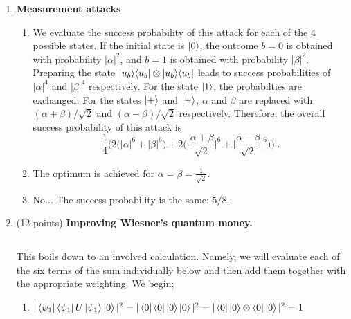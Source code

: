 \documentclass[12pt]{article}
\begin{document}
\begin{enumerate}
		


\item {\bf Measurement attacks}

\begin{enumerate}
\item We evaluate the success probability of this attack for each of the $4$ possible states. If the initial state is $\ket{0}$, the outcome $b=0$ is obtained with probability $|\alpha|^2$, and $b=1$ is obtained with probability $|\beta|^2$. Preparing the state $\ket{u_b}\!\bra{u_b} \otimes \ket{u_b}\!\bra{u_b}$ leads to success probabilities of $|\alpha|^4$ and $|\beta|^4$ respectively. For the state $\ket{1}$, the probabilties are exchanged. For the states $\ket{+}$ and $\ket{-}$, $\alpha$ and $\beta$ are replaced with $(\alpha + \beta)/\sqrt{2}$ and $(\alpha-\beta)/\sqrt{2}$ respectively. Therefore, the overall success probability of this attack is 
\[ \frac{1}{4}\Big( 2 \big( |\alpha|^6 + |\beta|^6\big) + 2\Big( \Big| \frac{\alpha + \beta}{\sqrt{2}}\Big|^6
+\Big| \frac{\alpha - \beta}{\sqrt{2}}\Big|^6\Big)\Big)\;.\]
\item The optimum is achieved for $\alpha=\beta=\frac{1}{\sqrt{2}}$. 
\item No... The success probability is the same: $5/8$. 
\end{enumerate}



\item (12 points) {\bf Improving Wiesner's quantum money.}

\subsection{}
This boils down to an involved calculation. Namely, we will evaluate each of the six terms of the sum individually below and then add them together with the appropriate weighting. We begin;
\begin{enumerate}
    \item $|\bra{\psi_1}\bra{\psi_1}U\ket{\psi_1} \ket{0}|^2 = |\bra{0}\bra{0}\ket{0}\ket{0}|^2 = |\bra{0}\ket{0}\otimes \bra{0}\ket{0}|^2 = 1 $
    

\end{enumerate}
\end{enumerate}
\end{document}
